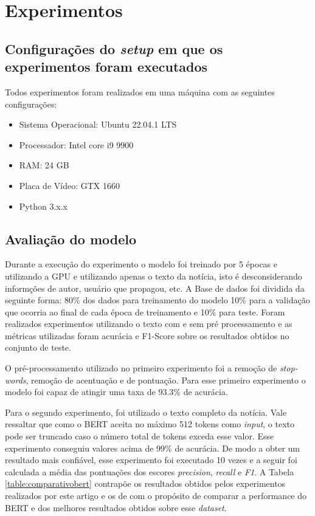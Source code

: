 \section{Experimentos}

\subsection{Configurações do \textit{setup} em que os experimentos foram executados}

Todos experimentos foram realizados em uma máquina com as seguintes configurações: 

\begin{itemize}
    \item Sistema Operacional: Ubuntu 22.04.1 LTS
    \item Processador: Intel core i9 9900
    \item RAM: 24 GB
    \item Placa de Vídeo: GTX 1660
    \item Python 3.x.x
\end{itemize}

\subsection{Avaliação do modelo}

Durante a execução do experimento o modelo foi treinado por 5 épocas e utilizando a GPU e utilizando apenas o texto da notícia, isto é desconsiderando informções de autor, usuário que propagou, etc. A Base de dados foi dividida da seguinte forma: 80\% dos dados para treinamento do modelo 10\% para a validação que ocorria ao final de cada época de treinamento e 10\% para teste. Foram realizados experimentos utilizando o texto com e sem pré processamento e as métricas utilizadas foram acurácia e F1-Score sobre os resultados obtidos no conjunto de teste.

O pré-processamento utilizado no primeiro experimento foi a remoção de \textit{stop-words}, remoção de acentuação e de pontuação. Para esse primeiro experimento o modelo foi capaz de atingir uma taxa de 93.3\% de acurácia.

Para o segundo experimento, foi utilizado o texto completo da notícia. Vale ressaltar que como o BERT aceita no máximo 512 tokens como \textit{input}, o texto pode ser truncado caso o número total de tokens exceda esse valor. Esse experimento conseguiu valores acima de 99\% de acurácia. De modo a obter um resultado mais confiável, esse experimento foi executado 10 vezes e a seguir foi calculada a média das pontuações dos escores \textit{precision}, \textit{recall} e \textit{F1}. A Tabela \ref{table:comparativobert} contrapõe os resultados obtidos pelos experimentos realizados por este artigo e os de \citet{Silva2020} com o propósito de comparar a performance do BERT e dos melhores resultados obtidos sobre esse \textit{dataset}.


